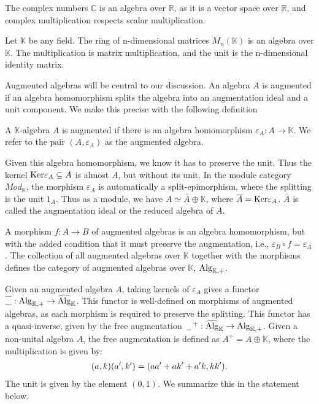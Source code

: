 \documentclass[../thesis.tex]{subfiles}
\begin{document}
            \begin{example}
                The complex numbers $\mathbb{C}$ is an algebra over $\mathbb{R}$, as it is a vector space over $\mathbb{R}$, and complex multiplication respects scalar multiplication.
            \end{example}

            \begin{example}
                Let $\mathbb{K}$ be any field. The ring of n-dimensional matrices $M_n(\mathbb{K})$ is an algebra over $\mathbb{K}$. The multiplication is matrix multiplication, and the unit is the n-dimensional identity matrix.
            \end{example}

            Augmented algebras will be central to our discussion. An algebra $A$ is augmented if an algebra homomorphism splits the algebra into an augmentation ideal and a unit component. We make this precise with the following definition

            \begin{definition}
                A $\mathbb{K}$-algebra $A$ is augmented if there is an algebra homomorphism $\varepsilon_A: A \rightarrow \mathbb{K}$. We refer to the pair $(A,\varepsilon_A)$ as the augmented algebra.
            \end{definition}

            Given this algebra homomorphism, we know it has to preserve the unit. Thus the kernel $\tt{Ker}\varepsilon_A \subseteq A$ is almost $A$, but without its unit. In the module category $Mod_\mathbb{K}$, the morphism $\varepsilon_A$ is automatically a split-epimorphism, where the splitting is the unit $1_A$. Thus as a module, we have $A \simeq \overline{A}\oplus\mathbb{K}$, where $\overline{A} = \tt{Ker}\varepsilon_A$. $\overline{A}$ is called the augmentation ideal or the reduced algebra of $A$.

            A morphism $f: A \rightarrow B$ of augmented algebras is an algebra homomorphism, but with the added condition that it must preserve the augmentation, i.e., $\varepsilon_B \circ f = \varepsilon_A$. The collection of all augmented algebras over $\mathbb{K}$ together with the morphisms defines the category of augmented algebras over $\mathbb{K}$, $\tt{Alg}_{\mathbb{K},+}$.

            Given an augmented algebra $A$, taking kernels of $\varepsilon_A$ gives a functor $\overline{\underline{\phantom{A}}} : \tt{Alg}_{\mathbb{K},+} \rightarrow \widehat{\tt{Alg}}_\mathbb{K}$. This functor is well-defined on morphisms of augmented algebras, as each morphism is required to preserve the splitting. This functor has a quasi-inverse, given by the free augmentation $\argument^+: \widehat{\tt{Alg}}_\mathbb{K} \rightarrow \tt{Alg}_{\mathbb{K},+}$. Given a non-unital algebra $A$, the free augmentation is defined as $A^+ = A\oplus\mathbb{K}$, where the multiplication is given by:
            \begin{align*}
                (a,k)(a',k') = (aa' + ak' + a'k, kk')\tt{.}
            \end{align*}
            The unit is given by the element $(0,1)$. We summarize this in the statement below.
            
\end{document}
